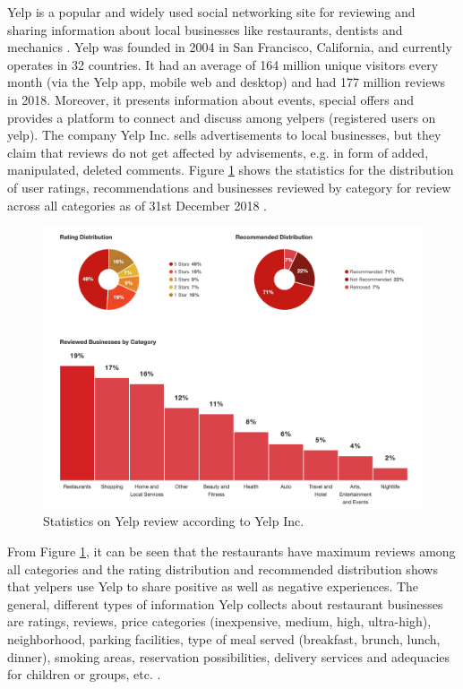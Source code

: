 \documentclass[a4paper, 11pt, oneside]{Thesis}  %
\begin{document}
Yelp is a popular and widely used social networking site for reviewing and sharing information about local businesses like restaurants, dentists and mechanics \cite{YelpInc..2018}. Yelp was founded in 2004 in San Francisco, California, and currently operates in 32 countries. It had an average of 164 million unique visitors every month (via the Yelp app, mobile web and desktop) and had 177 million reviews in 2018. Moreover, it presents information about events, special offers and provides a platform to connect and discuss among yelpers (registered users on yelp). The company Yelp Inc. sells advertisements to local businesses, but they claim that reviews do not get affected by advisements, e.g. in form of added, manipulated, deleted comments. Figure \ref{fig:yelp_factsheet_figures} shows the statistics for the distribution of user ratings, recommendations and businesses reviewed by category for review across all categories as of 31st December 2018 \cite{YelpInc..2018}.

\begin{figure}[h]
\includegraphics[scale=0.5]{Figures/Yelp_Factsheet_Figures.png}
\centering
\caption{Statistics on Yelp review according to Yelp Inc. \cite{YelpInc..2018}}
\label{fig:yelp_factsheet_figures}
\end{figure}

From Figure \ref{fig:yelp_factsheet_figures}, it can be seen that the restaurants have maximum reviews among all categories and the rating distribution and recommended distribution shows that yelpers use Yelp to share positive as well as negative experiences. The general, different types of information Yelp collects about restaurant businesses are ratings, reviews, price categories (inexpensive, medium, high, ultra-high), neighborhood, parking facilities, type of meal served (breakfast, brunch, lunch, dinner), smoking areas, reservation possibilities, delivery services and adequacies for children or groups, etc. \cite{YelpInc..2018}.  
\end{document}
